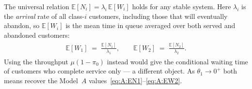 The universal relation $\mathbb{E}[N_i]=\lambda_i\,\mathbb{E}[W_i]$ holds for
any stable system.  Here $\lambda_i$ is the \emph{arrival} rate of all
class-$i$ customers, including those that will eventually abandon, so
$\mathbb{E}[W_i]$ is the mean time in queue averaged over both served and
abandoned customers:
\begin{align}
    \begin{split}
        \mathbb{E}[W_1]
        \;=\; \frac{\mathbb{E}[N_1]}{\lambda_1},
        \qquad
        \mathbb{E}[W_2]
        \;=\; \frac{\mathbb{E}[N_2]}{\lambda_2}.
    \end{split}
    \label{eq:C2:EW}
\end{align}
Using the throughput $\mu(1-\pi_0)$ instead would give the conditional
waiting time of customers who complete service only --- a different object.
As $\theta_1\to0^+$ both means recover the Model~$A$
values~\eqref{eq:A:EN1}--\eqref{eq:A:EW2}.

















